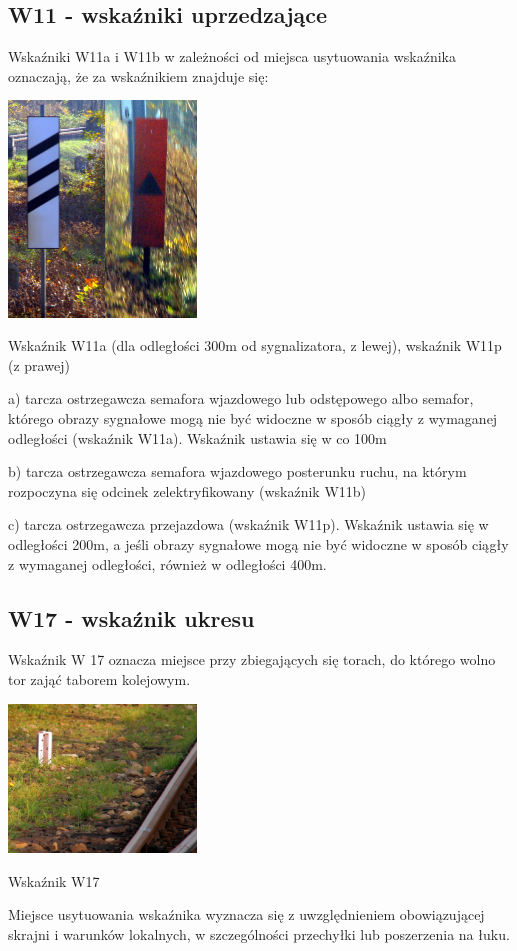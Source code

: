 \subsection{W11 - wskaźniki uprzedzające}
Wskaźniki W11a i W11b w zależności od miejsca usytuowania wskaźnika oznaczają, że za wskaźnikiem znajduje się:
\begin{marginfigure}
	\includegraphics[width=5cm]{skryptkierownik-img/wskazniki-w11.jpg}
	\caption{Wskaźnik W11a (dla odległości 300m od sygnalizatora, z lewej), wskaźnik W11p (z prawej)} 
\end{marginfigure}
a) tarcza ostrzegawcza semafora wjazdowego lub odstępowego albo semafor, którego obrazy sygnałowe mogą nie być widoczne w sposób ciągły z wymaganej odległości (wskaźnik W11a). Wskaźnik ustawia się w co 100m

b) tarcza ostrzegawcza semafora wjazdowego posterunku ruchu, na którym rozpoczyna się odcinek zelektryfikowany (wskaźnik W11b)

c) tarcza ostrzegawcza przejazdowa (wskaźnik W11p). Wskaźnik ustawia się w odległości 200m, a jeśli obrazy sygnałowe mogą nie być widoczne w sposób ciągły z wymaganej odległości, również w odległości 400m.


\subsection{W17 - wskaźnik ukresu}

\begin{tcolorbox}[colback=black!5!white,colframe=white!55!black,title=Wskaźnik W17]
Wskaźnik W 17 oznacza miejsce przy zbiegających się torach, do którego wolno tor zająć taborem kolejowym. 
\end{tcolorbox}
\begin{marginfigure}
	\includegraphics[width=5cm]{skryptkierownik-img/skryptkierownik-img016.jpg}
	\caption{Wskaźnik W17}
\end{marginfigure}
Miejsce usytuowania wskaźnika wyznacza się z uwzględnieniem obowiązującej skrajni i warunków lokalnych, w szczególności przechyłki lub poszerzenia na łuku.




